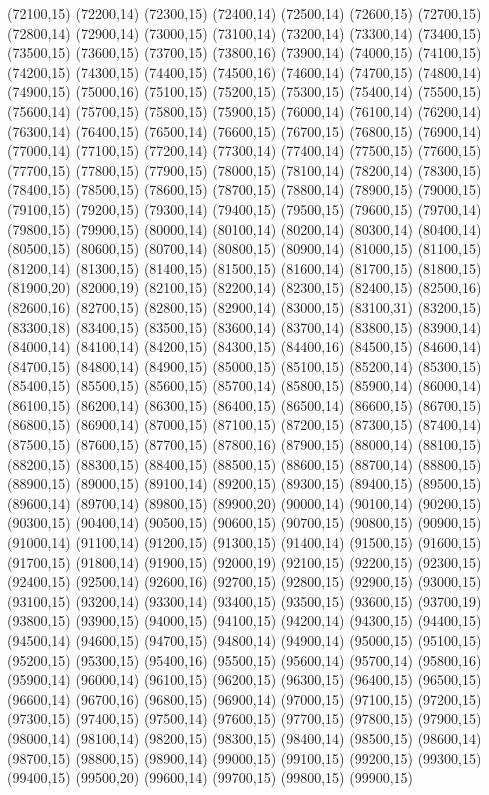(72100,15)
(72200,14)
(72300,15)
(72400,14)
(72500,14)
(72600,15)
(72700,15)
(72800,14)
(72900,14)
(73000,15)
(73100,14)
(73200,14)
(73300,14)
(73400,15)
(73500,15)
(73600,15)
(73700,15)
(73800,16)
(73900,14)
(74000,15)
(74100,15)
(74200,15)
(74300,15)
(74400,15)
(74500,16)
(74600,14)
(74700,15)
(74800,14)
(74900,15)
(75000,16)
(75100,15)
(75200,15)
(75300,15)
(75400,14)
(75500,15)
(75600,14)
(75700,15)
(75800,15)
(75900,15)
(76000,14)
(76100,14)
(76200,14)
(76300,14)
(76400,15)
(76500,14)
(76600,15)
(76700,15)
(76800,15)
(76900,14)
(77000,14)
(77100,15)
(77200,14)
(77300,14)
(77400,14)
(77500,15)
(77600,15)
(77700,15)
(77800,15)
(77900,15)
(78000,15)
(78100,14)
(78200,14)
(78300,15)
(78400,15)
(78500,15)
(78600,15)
(78700,15)
(78800,14)
(78900,15)
(79000,15)
(79100,15)
(79200,15)
(79300,14)
(79400,15)
(79500,15)
(79600,15)
(79700,14)
(79800,15)
(79900,15)
(80000,14)
(80100,14)
(80200,14)
(80300,14)
(80400,14)
(80500,15)
(80600,15)
(80700,14)
(80800,15)
(80900,14)
(81000,15)
(81100,15)
(81200,14)
(81300,15)
(81400,15)
(81500,15)
(81600,14)
(81700,15)
(81800,15)
(81900,20)
(82000,19)
(82100,15)
(82200,14)
(82300,15)
(82400,15)
(82500,16)
(82600,16)
(82700,15)
(82800,15)
(82900,14)
(83000,15)
(83100,31)
(83200,15)
(83300,18)
(83400,15)
(83500,15)
(83600,14)
(83700,14)
(83800,15)
(83900,14)
(84000,14)
(84100,14)
(84200,15)
(84300,15)
(84400,16)
(84500,15)
(84600,14)
(84700,15)
(84800,14)
(84900,15)
(85000,15)
(85100,15)
(85200,14)
(85300,15)
(85400,15)
(85500,15)
(85600,15)
(85700,14)
(85800,15)
(85900,14)
(86000,14)
(86100,15)
(86200,14)
(86300,15)
(86400,15)
(86500,14)
(86600,15)
(86700,15)
(86800,15)
(86900,14)
(87000,15)
(87100,15)
(87200,15)
(87300,15)
(87400,14)
(87500,15)
(87600,15)
(87700,15)
(87800,16)
(87900,15)
(88000,14)
(88100,15)
(88200,15)
(88300,15)
(88400,15)
(88500,15)
(88600,15)
(88700,14)
(88800,15)
(88900,15)
(89000,15)
(89100,14)
(89200,15)
(89300,15)
(89400,15)
(89500,15)
(89600,14)
(89700,14)
(89800,15)
(89900,20)
(90000,14)
(90100,14)
(90200,15)
(90300,15)
(90400,14)
(90500,15)
(90600,15)
(90700,15)
(90800,15)
(90900,15)
(91000,14)
(91100,14)
(91200,15)
(91300,15)
(91400,14)
(91500,15)
(91600,15)
(91700,15)
(91800,14)
(91900,15)
(92000,19)
(92100,15)
(92200,15)
(92300,15)
(92400,15)
(92500,14)
(92600,16)
(92700,15)
(92800,15)
(92900,15)
(93000,15)
(93100,15)
(93200,14)
(93300,14)
(93400,15)
(93500,15)
(93600,15)
(93700,19)
(93800,15)
(93900,15)
(94000,15)
(94100,15)
(94200,14)
(94300,15)
(94400,15)
(94500,14)
(94600,15)
(94700,15)
(94800,14)
(94900,14)
(95000,15)
(95100,15)
(95200,15)
(95300,15)
(95400,16)
(95500,15)
(95600,14)
(95700,14)
(95800,16)
(95900,14)
(96000,14)
(96100,15)
(96200,15)
(96300,15)
(96400,15)
(96500,15)
(96600,14)
(96700,16)
(96800,15)
(96900,14)
(97000,15)
(97100,15)
(97200,15)
(97300,15)
(97400,15)
(97500,14)
(97600,15)
(97700,15)
(97800,15)
(97900,15)
(98000,14)
(98100,14)
(98200,15)
(98300,15)
(98400,14)
(98500,15)
(98600,14)
(98700,15)
(98800,15)
(98900,14)
(99000,15)
(99100,15)
(99200,15)
(99300,15)
(99400,15)
(99500,20)
(99600,14)
(99700,15)
(99800,15)
(99900,15)
